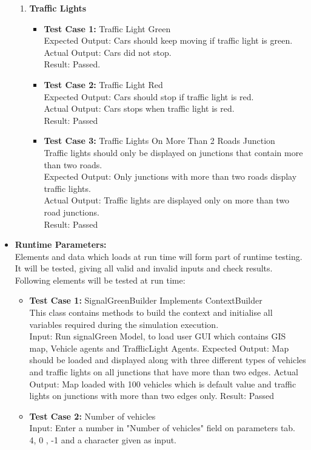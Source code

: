 \documentclass[11pt, oneside]{article}   	%
\begin{document}
\begin{itemize}
\begin{enumerate}
\item \textbf{Traffic Lights}
\begin{itemize}
\item \textbf{Test Case 1:} Traffic Light Green \hfill \\
Expected Output:
Cars should keep moving if traffic light is green.\hfill \\
Actual Output:
Cars did not stop.\hfil \\
Result:
Passed.
\item \textbf{Test Case 2:} Traffic Light Red\hfill \\
 Expected Output: Cars should stop if traffic light is red.\hfill \\
 Actual Output: Cars stops when traffic light is red.\hfill \\
 Result: Passed
 
 \item \textbf{Test Case 3:} Traffic Lights On More Than 2 Roads Junction\hfill \\
 Traffic lights should only be displayed on junctions that contain more than two roads.\hfill \\
 Expected Output: Only junctions with more than two roads display traffic lights.\hfill \\
 Actual Output: Traffic lights are displayed only on more than two road junctions.\hfill \\
 Result: Passed
\end{itemize}

 \end{enumerate}
\item \textbf{Runtime Parameters:} \hfill \\
Elements and data which loads at run time will form part of runtime testing. It will be tested, giving all valid and invalid inputs and check results. Following elements will be tested at run time:
\begin{itemize}
\item \textbf{Test Case 1:} SignalGreenBuilder Implements ContextBuilder\hfill \\
This class contains methods to build the context and initialise all variables required during the simulation execution.\hfil \\
Input: Run signalGreen Model, to load user GUI which contains GIS map, Vehicle agents and TrafflicLight Agents.
Expected Output: Map should be loaded and displayed along with three different types of vehicles and traffic lights on all junctions that have more than two edges.
Actual Output: Map loaded with 100 vehicles which is default value and traffic lights on junctions with more than two edges only.
Result: Passed
\item\textbf{Test Case 2:} Number of vehicles\hfill \\
Input: Enter a number in "Number of vehicles" field on parameters tab.\hfill \\
4, 0 , -1 and a character given as input.


\end{itemize}
\end{itemize}
\end{document}

